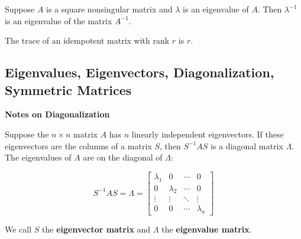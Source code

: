 \documentclass{article}
\begin{document}
Suppose \(A\) is a square nonsingular matrix and \(\lambda\) is an eigenvalue of \(A\). Then \(\lambda^{-1}\) is an eigenvalue of the matrix \(A^{-1}\).

The trace of an idempotent matrix with rank \(r\) is \(r\).

\subsection{Eigenvalues, Eigenvectors, Diagonalization, Symmetric Matrices}

\textbf{Notes on Diagonalization}

Suppose the \(n \times n\) matrix \(A\) has \(n\) linearly independent eigenvectors. If these eigenvectors are the columns of a matrix \(S\), then \(S^{-1}AS\) is a diagonal matrix \(\Lambda\). The eigenvalues of \(A\) are on the diagonal of \(\Lambda\):

\[
S^{-1}AS = \Lambda = \begin{bmatrix}
   \lambda_1       & 0  & \cdots  & 0  \\
  0  & \lambda_2 & \cdots  & 0 \\
  \vdots  & \vdots  & \ddots & \vdots \\
   0  & 0 & \cdots & \lambda_n
\end{bmatrix}
\]

We call \(S\) the \textbf{eigenvector matrix} and \(\Lambda\) the \textbf{eigenvalue matrix}.
\end{document}
